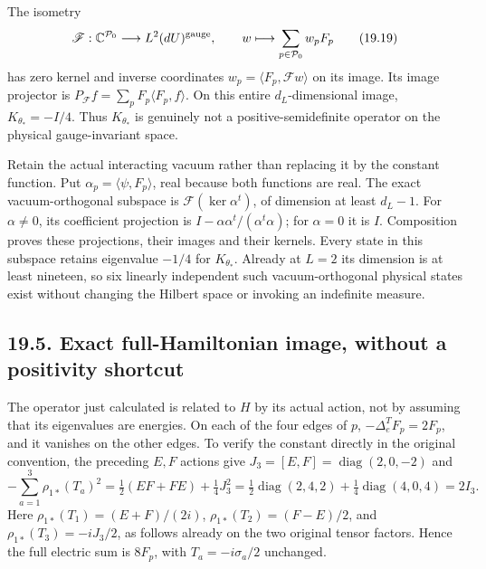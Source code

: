 \documentclass[
]{article}
\begin{document}
The isometry \[
\mathscr F:\mathbb C^{\mathcal P_0}\longrightarrow
L^2(dU)^{\rm gauge},\qquad w\longmapsto\sum_{p\in\mathcal P_0}w_pF_p
                                                               \tag{19.19}
\] has zero kernel and inverse coordinates
\(w_p=\langle F_p,\mathscr Fw\rangle\) on its image. Its image projector
is \(P_{\mathscr F}f=\sum_pF_p\langle F_p,f\rangle\). On this entire
\(d_L\)-dimensional image, \(K_{\theta_*}=-I/4\). Thus \(K_{\theta_*}\)
is genuinely not a positive-semidefinite operator on the physical
gauge-invariant space.

Retain the actual interacting vacuum rather than replacing it by the
constant function. Put \(\alpha_p=\langle\psi,F_p\rangle\), real because
both functions are real. The exact vacuum-orthogonal subspace is
\(\mathscr F(\ker\alpha^t)\), of dimension at least \(d_L-1\). For
\(\alpha\ne0\), its coefficient projection is
\(I-\alpha\alpha^t/(\alpha^t\alpha)\); for \(\alpha=0\) it is \(I\).
Composition proves these projections, their images and their kernels.
Every state in this subspace retains eigenvalue \(-1/4\) for
\(K_{\theta_*}\). Already at \(L=2\) its dimension is at least nineteen,
so six linearly independent such vacuum-orthogonal physical states exist
without changing the Hilbert space or invoking an indefinite measure.

\subsection{19.5. Exact full-Hamiltonian image, without a positivity
shortcut}\label{exact-full-hamiltonian-image-without-a-positivity-shortcut}

The operator just calculated is related to \(H\) by its actual action,
not by assuming that its eigenvalues are energies. On each of the four
edges of \(p\), \(-\Delta_e^T F_p=2F_p\), and it vanishes on the other
edges. To verify the constant directly in the original convention, the
preceding \(E,F\) actions give \(J_3=[E,F]=\operatorname{diag}(2,0,-2)\)
and \[
-\sum_{a=1}^3\rho_{1*}(T_a)^2
=\tfrac12(EF+FE)+\tfrac14J_3^2
=\tfrac12\operatorname{diag}(2,4,2)
 +\tfrac14\operatorname{diag}(4,0,4)=2I_3.
\] Here \(\rho_{1*}(T_1)=(E+F)/(2i)\), \(\rho_{1*}(T_2)=(F-E)/2\), and
\(\rho_{1*}(T_3)=-iJ_3/2\), as follows already on the two original
tensor factors. Hence the full electric sum is \(8F_p\), with
\(T_a=-i\sigma_a/2\) unchanged.
\end{document}
